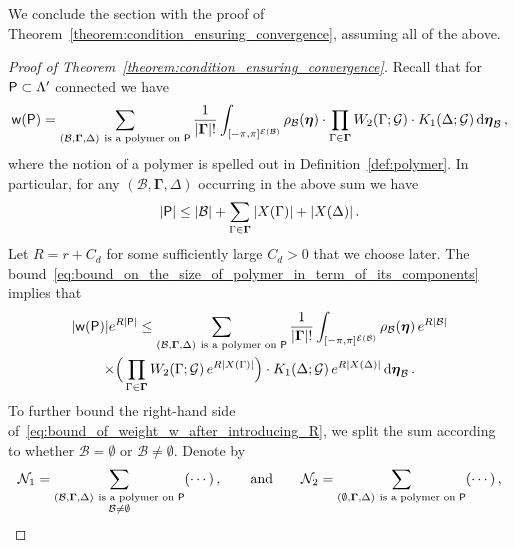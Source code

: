 \documentclass[11pt]{article}
\theoremstyle{definition}
\theoremstyle{remark}
\numberwithin{theorem}{section}
\def\La{{\Lambda}}
\def\Ga{{\Gamma}}
\newcommand{\cE}{\mathcal{E}}
\newcommand{\cB}{\mathcal B}
\begin{document}
    \noindent
    We conclude the section with the proof of Theorem~\ref{theorem:condition_ensuring_convergence}, assuming all of the above. 
    \begin{proof}[Proof of Theorem~\ref{theorem:condition_ensuring_convergence}]
        Recall that for ${\sf P}\subset \La^\prime$ connected we have 
        \begin{equation*}
        {\sf w}({\sf P}) = \sum_{(\mathcal{B},\mathbf{\Ga},\Delta) \ \text{is a polymer on } {\sf P}} \frac{1}{|\mathbf{\Ga}|!} \int_{[-\pi,\pi]^{\cE(\mathcal{B})}} \rho_{\mathcal{B}}(\boldsymbol{\eta}) \cdot   \prod_{\Ga\in \mathbf{\Ga}} W_2(\Ga;\mathcal{G}) \cdot K_1(\Delta;\mathcal{G}) \,  {\rm d}\boldsymbol{\eta}_{\mathcal{B}} \, , 
    \end{equation*}
    where the notion of a polymer is spelled out in Definition~\ref{def:polymer}. In particular, for any $(\mathcal{B},\mathbf{\Ga},\Delta)$ occurring in the above sum we have
    \begin{equation}
    \label{eq:bound_on_the_size_of_polymer_in_term_of_its_components}
        |{\sf P}| \le |\cB| + \sum_{\Ga\in \boldsymbol{\Ga}} |X(\Ga)| + |X(\Delta)| \, . 
    \end{equation}
    Let $R = r + C_d$ for some sufficiently large $C_d>0$ that we choose later. The bound~\eqref{eq:bound_on_the_size_of_polymer_in_term_of_its_components} implies that
    \begin{multline} \label{eq:bound_of_weight_w_after_introducing_R}
        |{\sf w}({\sf P})| e^{R|{\sf P}|}  \le  \sum_{(\mathcal{B},\mathbf{\Ga},\Delta) \ \text{is a polymer on } {\sf P}} \frac{1}{|\mathbf{\Ga}|!} \int_{[-\pi,\pi]^{\cE(\mathcal{B})}} \rho_{\mathcal{B}}(\boldsymbol{\eta}) \, e^{R|\cB|}  \\ \times   \Big(\prod_{\Ga\in \mathbf{\Ga}} W_2(\Ga;\mathcal{G}) \, e^{R|X(\Ga)|}\Big) \cdot K_1(\Delta;\mathcal{G}) \,  e^{R|X(\Delta)|} \,  {\rm d}\boldsymbol{\eta}_{\mathcal{B}} \, .
    \end{multline}
    To further bound the right-hand side of~\eqref{eq:bound_of_weight_w_after_introducing_R}, we split the sum according to whether $\mathcal{B} = \emptyset$ or $\mathcal{B}\not= \emptyset$. Denote by
    \begin{equation*}
        \mathcal{N}_1  =  \sum_{\substack{(\mathcal{B},\mathbf{\Ga},\Delta) \ \text{is a polymer on } {\sf P} \\ \mathcal{B}\not=\emptyset}} (\cdots)  \, ,  \qquad \text{and} \qquad \mathcal{N}_2 = \sum_{(\emptyset,\mathbf{\Ga},\Delta) \ \text{is a polymer on } {\sf P}} (\cdots) \, , 

\end{equation*}
\end{proof}
\end{document}
